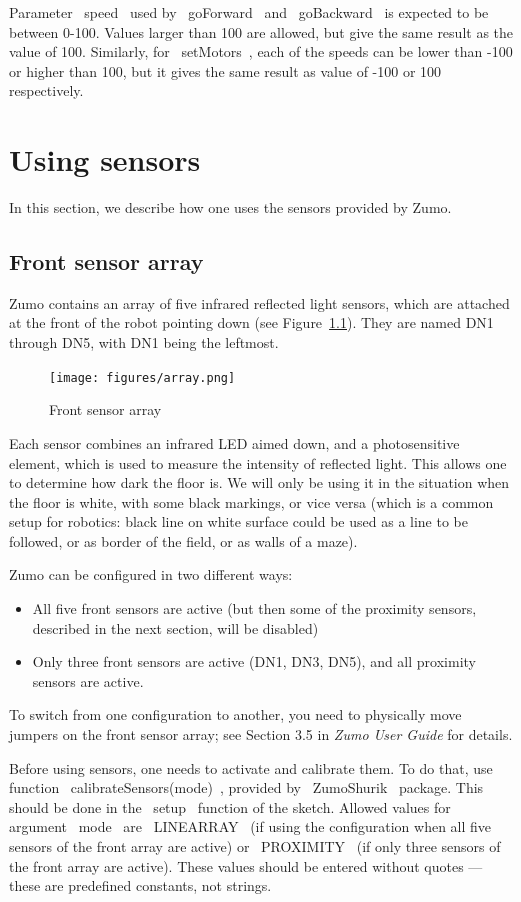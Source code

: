 \documentclass[oneside]{stml-l}
\numberwithin{figure}{chapter}
\newcommand{\firef}[1]{Figure\ {\rm\ref{#1}}}
\begin{document}
Parameter ~speed~ used by ~goForward~ and  ~goBackward~ is expected to be
between 0-100. Values larger than 100 are allowed, but give the same result as the
value of 100. Similarly, for ~setMotors~, each of the speeds can be lower than -100
or higher than 100, but it gives the same result as value of -100 or 100 respectively.

\chapter{Using sensors}

In this section, we describe how one uses the sensors provided by Zumo.

\section{Front sensor array}
Zumo contains an array of five infrared reflected light sensors,
which are attached at the front of the robot pointing down (see
\firef{f:front_array}). They are named DN1 through DN5, with DN1 being the
leftmost.

\begin{figure}[ht]
\texttt{[image: figures/array.png]}
\caption{Front sensor array}\label{f:front_array}
\end{figure}
Each sensor combines an infrared LED aimed down, and a
photosensitive element, which is used to measure the intensity
of reflected light. This allows one to determine how dark the
floor is. We will only be using it in the situation when the
floor is white, with some black markings, or vice versa (which is
a common setup for robotics: black line on white surface could be
used as a line to be followed, or as border of the field, or as
walls of a maze).

Zumo can be configured in two different ways:
\begin{itemize}
\item All five front sensors are active (but then some of the
proximity sensors, described in the next section, will be disabled)
\item Only three front sensors are active (DN1, DN3, DN5), and all
proximity sensors are active.
\end{itemize}
To switch from one configuration to another, you need to physically
move jumpers on the front sensor array; see Section 3.5 in
{\it Zumo User Guide} for details.

Before using sensors, one needs to activate and calibrate them.
To do that, use function ~calibrateSensors(mode)~, provided by
~ZumoShurik~ package. This should be done in the ~setup~ function
of the sketch. Allowed values for argument ~mode~ are ~LINEARRAY~
(if using the configuration when all five sensors of the front
array are active) or ~PROXIMITY~ (if only three sensors of the
front array are active). These values should be entered without
quotes --- these are predefined constants, not strings.
\end{document}
